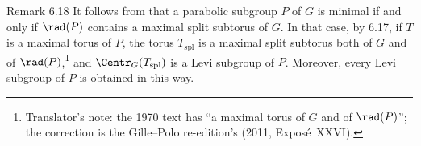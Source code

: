 \begin{sgastatement}{Remark 6.18}
It follows from  that a parabolic subgroup \(P\) of \(G\) is
minimal if and only if \(\rad(P)\) contains a maximal split subtorus
of \(G\).  In that case, by 6.17, if \(T\) is a maximal torus of \(P\),
the torus \(T_{\mathrm{spl}}\) is a maximal split subtorus both of \(G\)
and of \(\rad(P)\),\footnote{Translator's note: the 1970 text has ``a maximal torus of \(G\) and
of \(\rad(P)\)''; the correction is the Gille--Polo re-edition's (2011,
Exposé~XXVI).} and \(\Centr_G(T_{\mathrm{spl}})\) is a Levi
subgroup of \(P\).  Moreover, every Levi subgroup of \(P\) is
obtained in this way.
\end{sgastatement}
